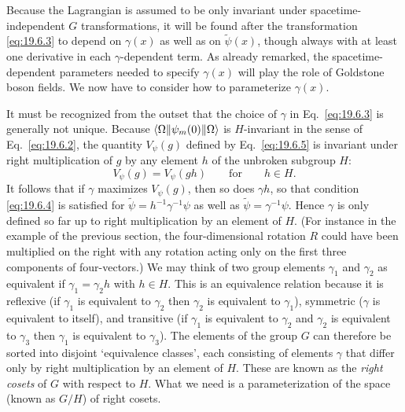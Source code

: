Because the Lagrangian is assumed to be only invariant under spacetime-independent $G$ transformations, it will be found after the transformation \eqref{eq:19.6.3} to depend on $\gamma(x)$ as well as on $\widetilde\psi(x)$, though always with at least one derivative in each $\gamma$-dependent term. As already remarked, the spacetime-dependent parameters needed to specify $\gamma(x)$ will play the role of Goldstone boson fields. We now have to consider how to parameterize $\gamma(x)$.

It must be recognized from the outset that the choice of $\gamma$ in Eq.~\eqref{eq:19.6.3} is generally not unique. Because $\langle \Omega\rVert\psi_m(0)\lVert \Omega\rangle$ is $H$-invariant in the sense of Eq.~\eqref{eq:19.6.2}, the quantity $V_\psi(g)$ defined by Eq.~\eqref{eq:19.6.5} is invariant under right multiplication of $g$ by any element $h$ of the unbroken subgroup $H$:
\begin{equation}
V_\psi(g)=V_\psi(gh)\qquad\text{for}\qquad h\in H.
\tag{19.6.6}\label{eq:19.6.6}
\end{equation}
It follows that if $\gamma$ maximizes $V_\psi(g)$, then so does $\gamma h$, so that condition \eqref{eq:19.6.4} is satisfied for $\widetilde\psi=h^{-1}\gamma^{-1}\psi$ as well as $\widetilde\psi=\gamma^{-1}\psi$. Hence $\gamma$ is only defined so far up to right multiplication by an element of $H$. (For instance in the example of the previous section, the four-dimensional rotation $R$ could have been multiplied on the right with any rotation acting only on the first three components of four-vectors.) We may think of two group elements $\gamma_1$ and $\gamma_2$ as equivalent if $\gamma_1=\gamma_2h$ with $h\in H$. This is an equivalence relation because it is reflexive (if $\gamma_1$ is equivalent to $\gamma_2$ then $\gamma_2$ is equivalent to $\gamma_1$), symmetric ($\gamma$ is equivalent to itself), and transitive (if $\gamma_1$ is equivalent to $\gamma_2$ and $\gamma_2$ is equivalent to $\gamma_3$ then $\gamma_1$ is equivalent to $\gamma_3$). The elements of the group $G$ can therefore be sorted into disjoint `equivalence classes', each consisting of elements $\gamma$ that differ only by right multiplication by an element of $H$. These are known as the \emph{right cosets} of $G$ with respect to $H$. What we need is a parameterization of the space (known as $G/H$) of right cosets.


